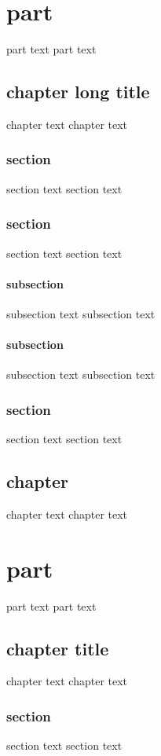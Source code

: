 \part{part}
         part text
         part text
         \chapter{chapter long title}
          chapter text
          chapter text
          \section[for the toc]{section}
           section text
           section text
          \section[for the toc]{section}
           section text
           section text
          \subsection[for the toc]{subsection}
          	subsection text
          	subsection text
          \subsection[for the toc]{subsection}
          	subsection text
          	subsection text
          \section[for the toc]{section}
           section text
           section text
         \chapter{chapter}
          chapter text
          chapter text
\part{part}
         part text
         part text
         \chapter[toc]{chapter title}
          chapter text
          chapter text
          \section[for the toc]{section}
           section text
           section text
